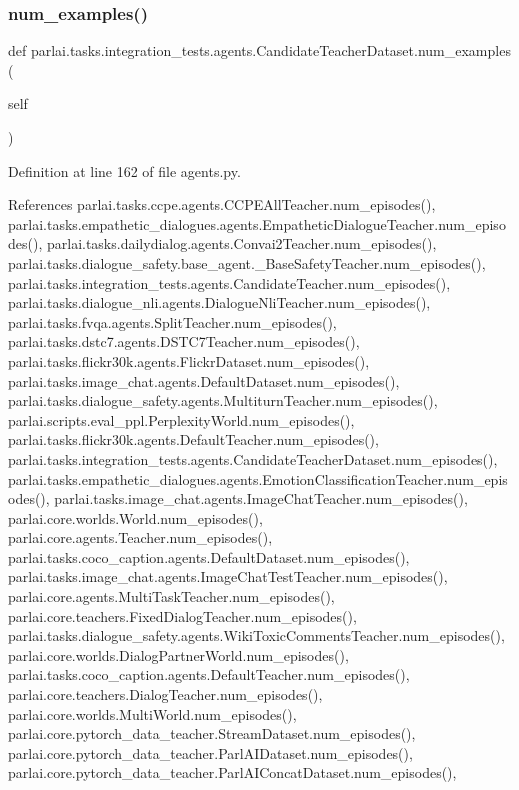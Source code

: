 \subsubsection{\texorpdfstring{num\+\_\+examples()}{num\_examples()}}
{\footnotesize\ttfamily def parlai.\+tasks.\+integration\+\_\+tests.\+agents.\+Candidate\+Teacher\+Dataset.\+num\+\_\+examples (\begin{DoxyParamCaption}\item[{}]{self }\end{DoxyParamCaption})}



Definition at line 162 of file agents.\+py.



References parlai.\+tasks.\+ccpe.\+agents.\+C\+C\+P\+E\+All\+Teacher.\+num\+\_\+episodes(), parlai.\+tasks.\+empathetic\+\_\+dialogues.\+agents.\+Empathetic\+Dialogue\+Teacher.\+num\+\_\+episodes(), parlai.\+tasks.\+dailydialog.\+agents.\+Convai2\+Teacher.\+num\+\_\+episodes(), parlai.\+tasks.\+dialogue\+\_\+safety.\+base\+\_\+agent.\+\_\+\+Base\+Safety\+Teacher.\+num\+\_\+episodes(), parlai.\+tasks.\+integration\+\_\+tests.\+agents.\+Candidate\+Teacher.\+num\+\_\+episodes(), parlai.\+tasks.\+dialogue\+\_\+nli.\+agents.\+Dialogue\+Nli\+Teacher.\+num\+\_\+episodes(), parlai.\+tasks.\+fvqa.\+agents.\+Split\+Teacher.\+num\+\_\+episodes(), parlai.\+tasks.\+dstc7.\+agents.\+D\+S\+T\+C7\+Teacher.\+num\+\_\+episodes(), parlai.\+tasks.\+flickr30k.\+agents.\+Flickr\+Dataset.\+num\+\_\+episodes(), parlai.\+tasks.\+image\+\_\+chat.\+agents.\+Default\+Dataset.\+num\+\_\+episodes(), parlai.\+tasks.\+dialogue\+\_\+safety.\+agents.\+Multiturn\+Teacher.\+num\+\_\+episodes(), parlai.\+scripts.\+eval\+\_\+ppl.\+Perplexity\+World.\+num\+\_\+episodes(), parlai.\+tasks.\+flickr30k.\+agents.\+Default\+Teacher.\+num\+\_\+episodes(), parlai.\+tasks.\+integration\+\_\+tests.\+agents.\+Candidate\+Teacher\+Dataset.\+num\+\_\+episodes(), parlai.\+tasks.\+empathetic\+\_\+dialogues.\+agents.\+Emotion\+Classification\+Teacher.\+num\+\_\+episodes(), parlai.\+tasks.\+image\+\_\+chat.\+agents.\+Image\+Chat\+Teacher.\+num\+\_\+episodes(), parlai.\+core.\+worlds.\+World.\+num\+\_\+episodes(), parlai.\+core.\+agents.\+Teacher.\+num\+\_\+episodes(), parlai.\+tasks.\+coco\+\_\+caption.\+agents.\+Default\+Dataset.\+num\+\_\+episodes(), parlai.\+tasks.\+image\+\_\+chat.\+agents.\+Image\+Chat\+Test\+Teacher.\+num\+\_\+episodes(), parlai.\+core.\+agents.\+Multi\+Task\+Teacher.\+num\+\_\+episodes(), parlai.\+core.\+teachers.\+Fixed\+Dialog\+Teacher.\+num\+\_\+episodes(), parlai.\+tasks.\+dialogue\+\_\+safety.\+agents.\+Wiki\+Toxic\+Comments\+Teacher.\+num\+\_\+episodes(), parlai.\+core.\+worlds.\+Dialog\+Partner\+World.\+num\+\_\+episodes(), parlai.\+tasks.\+coco\+\_\+caption.\+agents.\+Default\+Teacher.\+num\+\_\+episodes(), parlai.\+core.\+teachers.\+Dialog\+Teacher.\+num\+\_\+episodes(), parlai.\+core.\+worlds.\+Multi\+World.\+num\+\_\+episodes(), parlai.\+core.\+pytorch\+\_\+data\+\_\+teacher.\+Stream\+Dataset.\+num\+\_\+episodes(), parlai.\+core.\+pytorch\+\_\+data\+\_\+teacher.\+Parl\+A\+I\+Dataset.\+num\+\_\+episodes(), parlai.\+core.\+pytorch\+\_\+data\+\_\+teacher.\+Parl\+A\+I\+Concat\+Dataset.\+num\+\_\+episodes(), 